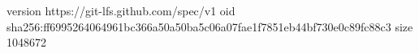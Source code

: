 version https://git-lfs.github.com/spec/v1
oid sha256:ff6995264064961bc366a50a50ba5c06a07fae1f7851eb44bf730e0c89fc88c3
size 1048672
